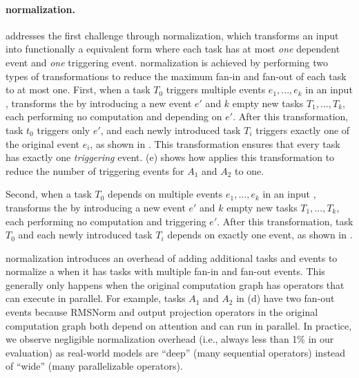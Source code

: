 \paragraph{\graph normalization.} \Sys addresses the first challenge through \graph normalization, which transforms an input \graph into functionally a equivalent form where each task has at most {\em one} dependent event and {\em one} triggering event. \graph normalization is achieved by performing two types of transformations to reduce the maximum fan-in and fan-out of each task to at most one. First, when a task $T_0$  triggers multiple events $e_1,...,e_k$ in an input \graph, \sys transforms the \graph by introducing a new event $e'$ and $k$ empty new tasks $T_1,...,T_k$, each performing no computation and depending on $e'$. After this transformation, task $t_0$ triggers only $e'$, and each newly introduced task $T_i$ triggers exactly one of the original event $e_i$, as shown in . 
This transformation ensures that every task has exactly one {\em triggering} event. (e) shows how \sys applies this transformation to reduce the number of triggering events for $A_1$ and $A_2$ to one.

Second, when a task $T_0$ depends on multiple events $e_1, ..., e_k$ in an input \graph, \sys transforms the \graph by introducing a new event $e'$ and $k$ empty new tasks $T_1,...,T_k$, each performing no computation and triggering $e'$. After this transformation, task $T_0$ and each newly introduced task $T_i$ depends on exactly one event, as shown in .

\graph normalization introduces an overhead of adding additional tasks and events to normalize a \graph when it has tasks with multiple fan-in and fan-out events. This generally only happens when the original computation graph has operators that can execute in parallel. For example, tasks $A_1$ and $A_2$ in (d) have two fan-out events because RMSNorm and output projection operators in the original computation graph both depend on attention and can run in parallel. In practice, we observe negligible normalization overhead (i.e., always less than 1\% in our evaluation) as real-world models are ``deep'' (many sequential operators) instead of ``wide'' (many parallelizable operators).

